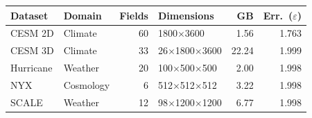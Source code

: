 \begin{tabular}{@{}llrlrr@{}}
\toprule
\textbf{Dataset} & \textbf{Domain} & \textbf{Fields} & \textbf{Dimensions} & \textbf{GB} & \textbf{Err.\ ($\varepsilon$)} \\
\midrule
CESM 2D & Climate & 60 & 1800$\times$3600 & 1.56 & 1.763 \\
CESM 3D & Climate & 33 & 26$\times$1800$\times$3600 & 22.24 & 1.999 \\
Hurricane & Weather & 20 & 100$\times$500$\times$500 & 2.00 & 1.998 \\
NYX & Cosmology & 6 & 512$\times$512$\times$512 & 3.22 & 1.998 \\
SCALE & Weather & 12 & 98$\times$1200$\times$1200 & 6.77 & 1.998 \\
\bottomrule
\end{tabular}
